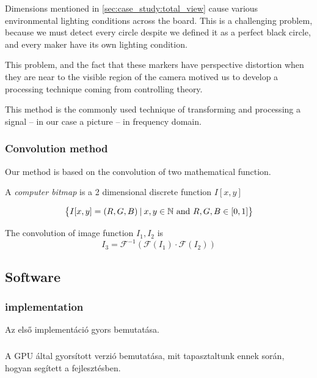 Dimensions mentioned in \cref{sec:case_study:total_view} cause various environmental lighting conditions across the board. This is a challenging problem, because we must detect every circle despite we defined it as a perfect black circle, and every maker have its own lighting condition. 

This problem, and the fact that these markers have perspective distortion when they are near to the visible region of the camera motived us to develop a processing technique coming from controlling theory.

This method is the commonly used technique of transforming and processing a signal -- in our case a picture -- in frequency domain.

\subsubsection{Convolution method}

Our method is based on the convolution of two mathematical function.

\begin{dfn}
	A \emph{computer bitmap} is a 2 dimensional discrete function $I[x,y]$

	\begin{equation}
		\big\{I[x, y] = (R,G,B) \:|\: x,y \in \mathbb{N} \ \text{and}\ R,G,B \in [0,1] \big\}
	\end{equation}
\end{dfn}

\begin{dfn}
	The convolution of image function $I_1, I_2$ is \partitions
	\begin{equation}
		I_3 = \mathscr{F}^{-1}(\mathscr{F}(I_1) \cdot \mathscr{F}(I_2))
	\end{equation}
\end{dfn}

\subsection{Software}

\subsubsection{ implementation}
Az első implementáció gyors bemutatása.
\subsubsection{}
A GPU által gyorsított verzió bemutatása, mit tapasztaltunk ennek során, hogyan segített a fejlesztésben.

